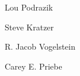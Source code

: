 \documentclass[10pt,journal,cspaper,compsoc]{IEEEtran}
\begin{document}
\begin{IEEEbiographynophoto}{Lou Podrazik}

\end{IEEEbiographynophoto}

\begin{IEEEbiographynophoto}{Steve Kratzer}

\end{IEEEbiographynophoto}



\begin{IEEEbiographynophoto}{R. Jacob Vogelstein}
\end{IEEEbiographynophoto}

\begin{IEEEbiographynophoto}{Carey E. Priebe}
\end{IEEEbiographynophoto}

\end{document}

